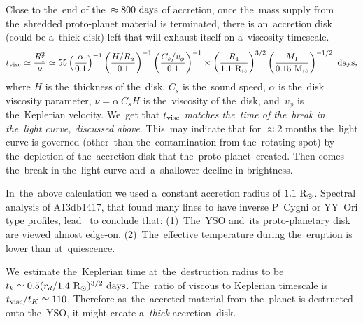 \documentclass[galaxies,article,accept,moreauthors,pdftex]{mdpi}
\def \days{~\rm{days}}
\def \sun{\odot}
\def \rmModot{~\rm{M_{\sun}}}
\def \rmRodot{~\rm{R_{\sun}}}
\begin{document}
Close to the~end of the~$\approx 800 \days$ of accretion, once the~mass supply from the~shredded proto-planet material is terminated, there is an~accretion disk (could be a~thick disk) left that will exhaust itself on a~viscosity timescale.
\begin{equation}
t_{\rm{visc}} \simeq \frac{R_1^2}{\nu} \simeq 55
\left(\frac{\alpha}{0.1}\right)^{-1}
\left(\frac{H/R_a}{0.1}\right)^{-1}
\left(\frac{C_s/v_\phi}{0.1}\right)^{-1}
\times
\left(\frac{R_1}{1.1 \rmRodot}\right)^{3/2}
\left(\frac{M_1}{0.15 \rmModot}\right)^{-1/2} ~\rm{days}, %
\label{eq:tvisc1}
\end{equation}
where $H$ is the~thickness of the~disk, $C_s$ is the~sound speed, $\alpha$ is the~disk viscosity parameter, $\nu=\alpha ~C_s H$ is the~viscosity of the~disk, and~$v_\phi$ is the~Keplerian velocity.
We~get that \textit{$t_{\rm{visc}}$ matches the~time of the~break in the~light curve, discussed above}. This~may indicate that for $\approx2$ months the~light curve is governed (other~than the~contamination from the~rotating spot) by the~depletion of the~accretion disk that the~proto-planet~created. Then comes the~break in the~light curve and~a~shallower decline in brightness.

In~the~above calculation we used a~constant accretion radius of $1.1 \rmRodot$.
Spectral analysis of A13db1417, that found many lines to have inverse P~Cygni or YY~Ori type profiles, lead~\cite{SiciliaAguilaretal2017} to conclude that: (1)~The~YSO and~its proto-planetary disk are viewed almost edge-on. (2)~The~effective temperature during the~eruption is lower than at~quiescence.

We~estimate the~Keplerian time at~the~destruction radius to be $t_k \simeq 0.5 (r_d / 1.4 \rmRodot)^{3/2} \days$. %
The~ratio of viscous to Keplerian timescale is $t_{\rm{visc}}/t_K \simeq 110$. Therefore as~the~accreted material from the~planet is destructed onto the~YSO, it might create a~\textit{thick} accretion~disk.
\end{document}
